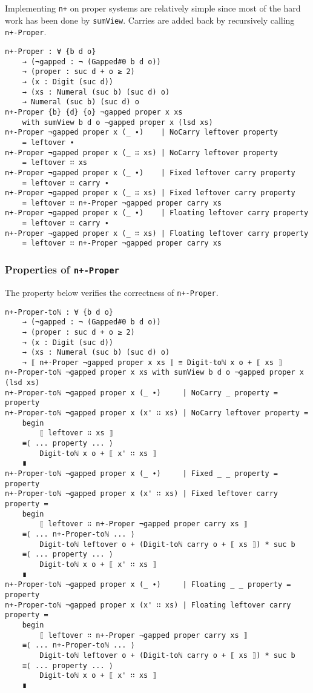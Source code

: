 \documentclass[\main/thesis.tex]{subfiles}
\begin{document}
Implementing \lstinline|n+| on proper systems are relatively simple since most
of the hard work has been done by \lstinline|sumView|.
Carries are added back by recursively calling \lstinline|n+-Proper|.

\begin{lstlisting}[basicstyle=\ttfamily\scriptsize]
n+-Proper : ∀ {b d o}
    → (¬gapped : ¬ (Gapped#0 b d o))
    → (proper : suc d + o ≥ 2)
    → (x : Digit (suc d))
    → (xs : Numeral (suc b) (suc d) o)
    → Numeral (suc b) (suc d) o
n+-Proper {b} {d} {o} ¬gapped proper x xs
    with sumView b d o ¬gapped proper x (lsd xs)
n+-Proper ¬gapped proper x (_ ∙)    | NoCarry leftover property
    = leftover ∙
n+-Proper ¬gapped proper x (_ ∷ xs) | NoCarry leftover property
    = leftover ∷ xs
n+-Proper ¬gapped proper x (_ ∙)    | Fixed leftover carry property
    = leftover ∷ carry ∙
n+-Proper ¬gapped proper x (_ ∷ xs) | Fixed leftover carry property
    = leftover ∷ n+-Proper ¬gapped proper carry xs
n+-Proper ¬gapped proper x (_ ∙)    | Floating leftover carry property
    = leftover ∷ carry ∙
n+-Proper ¬gapped proper x (_ ∷ xs) | Floating leftover carry property
    = leftover ∷ n+-Proper ¬gapped proper carry xs
\end{lstlisting}

\subsubsection{Properties of \lstinline|n+-Proper|}

The property below verifies the correctness of \lstinline|n+-Proper|.

\begin{lstlisting}[basicstyle=\ttfamily\scriptsize]
n+-Proper-toℕ : ∀ {b d o}
    → (¬gapped : ¬ (Gapped#0 b d o))
    → (proper : suc d + o ≥ 2)
    → (x : Digit (suc d))
    → (xs : Numeral (suc b) (suc d) o)
    → ⟦ n+-Proper ¬gapped proper x xs ⟧ ≡ Digit-toℕ x o + ⟦ xs ⟧
n+-Proper-toℕ ¬gapped proper x xs with sumView b d o ¬gapped proper x (lsd xs)
n+-Proper-toℕ ¬gapped proper x (_ ∙)     | NoCarry _ property = property
n+-Proper-toℕ ¬gapped proper x (x' ∷ xs) | NoCarry leftover property =
    begin
        ⟦ leftover ∷ xs ⟧
    ≡⟨ ... property ... ⟩
        Digit-toℕ x o + ⟦ x' ∷ xs ⟧
    ∎
n+-Proper-toℕ ¬gapped proper x (_ ∙)     | Fixed _ _ property = property
n+-Proper-toℕ ¬gapped proper x (x' ∷ xs) | Fixed leftover carry property =
    begin
        ⟦ leftover ∷ n+-Proper ¬gapped proper carry xs ⟧
    ≡⟨ ... n+-Proper-toℕ ... ⟩
        Digit-toℕ leftover o + (Digit-toℕ carry o + ⟦ xs ⟧) * suc b
    ≡⟨ ... property ... ⟩
        Digit-toℕ x o + ⟦ x' ∷ xs ⟧
    ∎
n+-Proper-toℕ ¬gapped proper x (_ ∙)     | Floating _ _ property = property
n+-Proper-toℕ ¬gapped proper x (x' ∷ xs) | Floating leftover carry property =
    begin
        ⟦ leftover ∷ n+-Proper ¬gapped proper carry xs ⟧
    ≡⟨ ... n+-Proper-toℕ ... ⟩
        Digit-toℕ leftover o + (Digit-toℕ carry o + ⟦ xs ⟧) * suc b
    ≡⟨ ... property ... ⟩
        Digit-toℕ x o + ⟦ x' ∷ xs ⟧
    ∎
\end{lstlisting}
\end{document}
